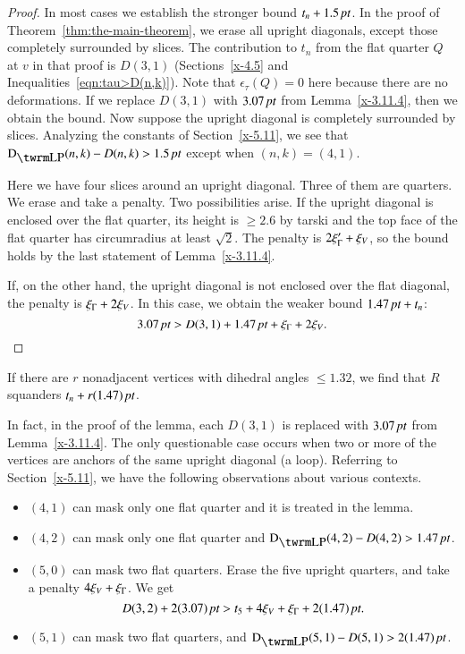 \begin{proof}
In most cases we establish the stronger bound $t_n+1.5\,\hbox{\it pt}$. In the
proof of Theorem~\ref{thm:the-main-theorem}, we erase all upright
diagonals, except those completely surrounded by slices. The
contribution to $t_n$ from the flat quarter $Q$ at $v$ in that proof is
$D(3,1)$ (Sections~\ref{x-4.5} and Inequalities~\ref{eqn:tau>D(n,k)}).
Note that $\epsilon_\tau(Q)=0$ here because there are no deformations.
If we replace $D(3,1)$ with $3.07\,\hbox{\it pt}$ from Lemma~\ref{x-3.11.4}, then
we obtain the bound. Now suppose the upright diagonal is completely
surrounded by slices. Analyzing the constants of
Section~\ref{x-5.11}, we see that $\DLP(n,k)-D(n,k)>1.5\,\pt$ except
when $(n,k)=(4,1)$.

Here we have four slices around an upright diagonal. Three
of them are quarters.  We erase and take a penalty. Two possibilities
arise.  If the upright diagonal is enclosed over the flat quarter, its
height is $\ge2.6$ by tarski and the top face of the
flat quarter has circumradius at least $\sqrt2$.  The penalty is
$2\xi_\Gamma'+\xi_V$, so the bound holds by the last statement of
Lemma~\ref{x-3.11.4}.

If, on the other hand, the upright diagonal is not enclosed over the
flat diagonal, the penalty is $\xi_\Gamma+2\xi_V$.  In this case, we obtain the
weaker bound $1.47\,\hbox{\it pt}+t_n$:
    $$3.07\,\hbox{\it pt} > D(3,1) + 1.47\,\hbox{\it pt} +\xi_\Gamma+2\xi_V.$$
\end{proof}

\begin{remark} \label{remark:1.47}
If there are $r$ nonadjacent vertices with dihedral angles
$\le1.32$, we find that $R$ squanders $t_n+r(1.47)\,\hbox{\it pt}$.
\end{remark}

In fact, in the proof of the lemma, each $D(3,1)$ is replaced with
$3.07\,\hbox{\it pt}$ from Lemma~\ref{x-3.11.4}.  The only questionable case
occurs when two or more of the vertices are anchors of the same upright
diagonal (a loop). Referring to Section~\ref{x-5.11}, we have the
following observations about various contexts.

\begin{itemize}
    \item $(4,1)$ can mask only one flat quarter and it is treated in the
lemma.
    \item $(4,2)$ can mask only one flat quarter and
    $\DLP(4,2)-D(4,2)>1.47\,\pt$.
    \item $(5,0)$ can mask two flat quarters.  Erase the five upright quarters,
        and take a penalty $4\xi_V+\xi_\Gamma$.  We get
    $$D(3,2)+2(3.07)\,\hbox{\it pt} > t_5+4\xi_V+\xi_\Gamma+2(1.47)\,\hbox{\it pt}.$$
    \item $(5,1)$ can mask two flat quarters, and $\DLP(5,1)-D(5,1)>2(1.47)\,\pt$.
\end{itemize}




